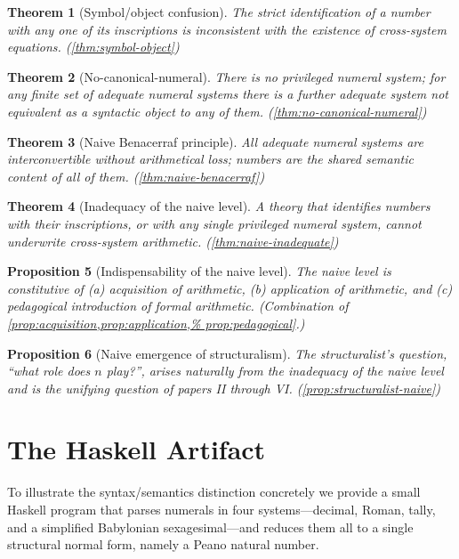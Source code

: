\documentclass[12pt]{article}
\newtheorem{theorem}{Theorem}[section]
\newtheorem{proposition}[theorem]{Proposition}
\theoremstyle{definition}
\theoremstyle{remark}
\begin{document}
\begin{theorem}[Symbol/object confusion]
The strict identification of a number with any one of its inscriptions
is inconsistent with the existence of cross-system equations.
(\cref{thm:symbol-object})
\end{theorem}

\begin{theorem}[No-canonical-numeral]
There is no privileged numeral system; for any finite set of adequate
numeral systems there is a further adequate system not equivalent as a
syntactic object to any of them. (\cref{thm:no-canonical-numeral})
\end{theorem}

\begin{theorem}[Naive Benacerraf principle]
All adequate numeral systems are interconvertible without arithmetical
loss; numbers are the shared semantic content of all of them.
(\cref{thm:naive-benacerraf})
\end{theorem}

\begin{theorem}[Inadequacy of the naive level]
A theory that identifies numbers with their inscriptions, or with any
single privileged numeral system, cannot underwrite cross-system
arithmetic. (\cref{thm:naive-inadequate})
\end{theorem}

\begin{proposition}[Indispensability of the naive level]
The naive level is constitutive of (a) acquisition of arithmetic, (b)
application of arithmetic, and (c) pedagogical introduction of formal
arithmetic. (Combination of \cref{prop:acquisition,prop:application,%
prop:pedagogical}.)
\end{proposition}

\begin{proposition}[Naive emergence of structuralism]
The structuralist's question, ``what role does $n$ play?'', arises
naturally from the inadequacy of the naive level and is the unifying
question of papers II through VI. (\cref{prop:structuralist-naive})
\end{proposition}

\section{The Haskell Artifact}
\label{sec:haskell}

To illustrate the syntax/semantics distinction concretely we provide a
small Haskell program that parses numerals in four systems---decimal,
Roman, tally, and a simplified Babylonian sexagesimal---and reduces them
all to a single structural normal form, namely a Peano natural number.
\end{document}
